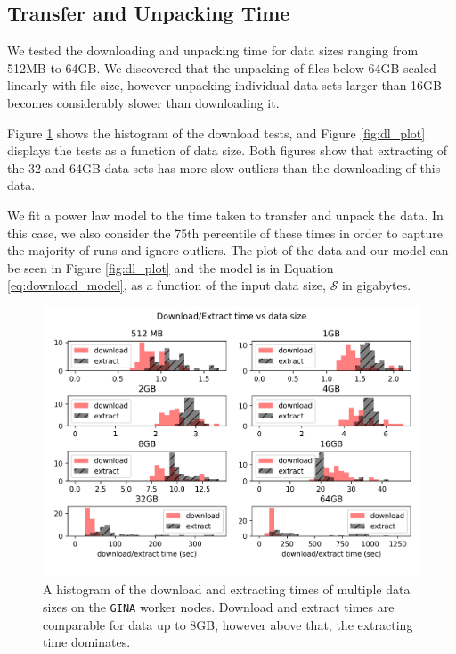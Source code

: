 \documentclass[preprint,5p]{elsarticle}
\begin{document}
\subsection{Transfer and Unpacking Time}\label{sec:results_dl}

We tested the downloading and unpacking time for data sizes ranging from 512MB to 64GB. We discovered that the unpacking of files below 64GB scaled linearly with file size, however unpacking individual data sets larger than 16GB becomes considerably slower than downloading it. 

Figure \ref{fig:dl_hist} shows the histogram of the download tests, and Figure \ref{fig:dl_plot} displays the tests as a function of data size. Both figures show that extracting of the 32 and 64GB data sets has more slow outliers than the downloading of this data. 

We fit a power law model to the time taken to transfer and unpack the data. In this case, we also consider the 75th percentile of these times in order to capture the majority of runs and ignore outliers. The plot of the data and our model can be seen in Figure \ref{fig:dl_plot} and the model is in Equation \ref{eq:download_model}, as a function of the input data size,
$\mathcal{S} $ in gigabytes.

\begin{figure}
    \includegraphics[width=0.95\linewidth]{figures/dl_ex_hatched.png}
      \caption{A histogram of the download and extracting times of multiple data sizes on the \texttt{GINA} worker nodes. Download and extract times are comparable for data up to 8GB, however above that, the extracting time dominates.  }
	\label{fig:dl_hist}
\end{figure}
\end{document}
